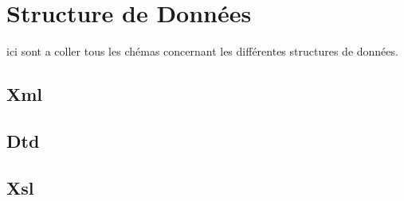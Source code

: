 \section{Structure de Données}
ici sont a coller tous les chémas concernant les différentes structures de données.

\subsection{Xml}

\subsection{Dtd}

\subsection{Xsl}


